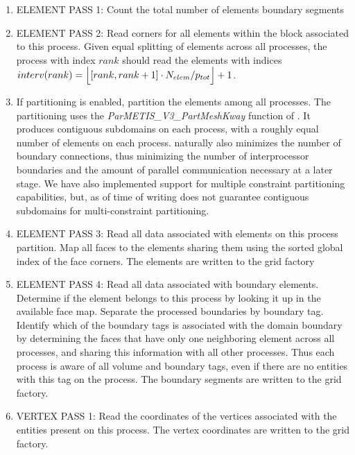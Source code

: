\begin{mybox}
\begin{enumerate}
  \item ELEMENT PASS 1: Count the total number of elements boundary segments

  \item ELEMENT PASS 2: Read corners for all elements within the block associated to this process. Given equal splitting of elements across all processes, the process with index $rank$ should read the elements with indices $interv(rank) = \floor[\Big]{ [rank, rank+1] \cdot N_{elem} / p_{tot} } + 1$.
        
  \item If partitioning is enabled, partition the elements among all processes. The partitioning uses the \textit{ParMETIS\_V3\_PartMeshKway} function of \ParMETIS{} \citeParMetis{}. It produces contiguous subdomains on each process, with a roughly equal number of elements on each process. \ParMETIS{} naturally also minimizes the number of boundary connections, thus minimizing the number of interprocessor boundaries and the amount of parallel communication necessary at a later stage. We have also implemented support for \ParMETIS{} multiple constraint partitioning capabilities, but, as of time of writing \ParMETIS{} does not guarantee contiguous subdomains for multi-constraint partitioning.
        
  \item ELEMENT PASS 3: Read all data associated with elements on this process partition. Map all faces to the elements sharing them using the sorted global index of the face corners. The elements are written to the grid factory
       
  \item ELEMENT PASS 4: Read all data associated with boundary elements. Determine if the element belongs to this process by looking it up in the available face map. Separate the processed boundaries by boundary tag. Identify which of the boundary tags is associated with the domain boundary by determining the faces that have only one neighboring element across all processes, and sharing this information with all other processes. Thus each process is aware of all volume and boundary tags, even if there are no entities with this tag on the process. The boundary segments are written to the grid factory.

  \item VERTEX PASS 1: Read the coordinates of the vertices associated with the entities present on this process. The vertex coordinates are written to the grid factory.
\end{enumerate}
\end{mybox}

